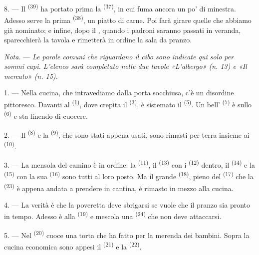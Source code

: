 8. --- Il  \textsuperscript{(39)} ha portato prima la
 \textsuperscript{(37)}, in cui fuma ancora un po' di minestra.
Adesso serve la prima  \textsuperscript{(38)}, un piatto di carne. Poi
farà girare quelle che abbiamo già nominato; e infine, dopo il , quando
i padroni saranno passati in veranda, sparecchierà la tavola e rimetterà in ordine la
sala da pranzo.

\textit{Nota.} --- \textit{Le parole comuni che riguardano il cibo sono indicate qui
solo per sommi capi. L'elenco sarà completato nelle due tavole «L'albergo» (n. 13) e
«Il mercato» (n. 15).}

\VUsaut{4.6mm}
\VUsaut{3.0mm}

1. --- Nella cucina, che intravediamo dalla porta socchiusa, c'è un disordine
pittoresco. Davanti al  \textsuperscript{(1)}, dove crepita il
 \textsuperscript{(3)}, è sistemato il 
\textsuperscript{(5)}. Un bell' \textsuperscript{(7)} è sullo
 \textsuperscript{(6)} e sta finendo di cuocere.

2. --- Il  \textsuperscript{(8)} e la 
\textsuperscript{(9)}, che sono stati appena usati, sono rimasti per terra insieme ai
 \textsuperscript{(10)}.

3. --- La mensola del camino è in ordine: la 
\textsuperscript{(11)}, il  \textsuperscript{(13)} con i
 \textsuperscript{(12)} dentro, il 
\textsuperscript{(14)} e la  \textsuperscript{(15)} con la sua
 \textsuperscript{(16)} sono tutti al loro posto. Ma il grande
 \textsuperscript{(18)}, pieno del 
\textsuperscript{(17)} che la  \textsuperscript{(23)} è appena andata a
prendere in cantina, è rimasto in mezzo alla cucina.

4. --- La verità è che la poveretta deve sbrigarsi se vuole che il pranzo sia pronto
in tempo. Adesso è alla  \textsuperscript{(19)} e mescola una
 \textsuperscript{(24)} che non deve attaccarsi.

5. --- Nel  \textsuperscript{(20)} cuoce una torta che ha fatto per la
merenda dei bambini. Sopra la cucina economica sono appesi il 
\textsuperscript{(21)} e la  \textsuperscript{(22)}.

